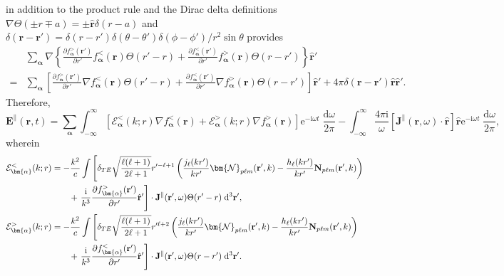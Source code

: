 in addition to the product rule and the Dirac delta definitions $\nabla\Theta(\pm r \mp a) = \pm\hat{\mathbf{r}}\delta(r - a)$ and $\delta(\mathbf{r} - \mathbf{r}') = \delta(r - r')\delta(\theta - \theta')\delta(\phi - \phi')/r^2\sin\theta$ provides
\begin{equation}
\begin{split}
&\sum_{\bm{\alpha}}\nabla\left\{\frac{\partial f_{\bm{\alpha}}^>(\mathbf{r}')}{\partial r'}f_{\bm{\alpha}}^<(\mathbf{r})\Theta(r' - r) + \frac{\partial f_{\bm{\alpha}}^<(\mathbf{r}')}{\partial r'}f_{\bm{\alpha}}^>(\mathbf{r})\Theta(r - r')\right\}\hat{\mathbf{r}}'\\
=&\sum_{\bm{\alpha}}\left[\frac{\partial f_{\bm{\alpha}}^>(\mathbf{r}')}{\partial r'}\nabla f_{\bm{\alpha}}^<(\mathbf{r})\Theta(r' - r) + \frac{\partial f_{\bm{\alpha}}^<(\mathbf{r}')}{\partial r'} \nabla f_{\bm{\alpha}}^>(\mathbf{r})\Theta(r - r')\right]\hat{\mathbf{r}}' + 4\pi\delta(\mathbf{r} - \mathbf{r}')\hat{\mathbf{r}}\hat{\mathbf{r}}'.
\end{split}
\end{equation}
Therefore,
\begin{equation}\label{eq:Elongitudinal2}
\mathbf{E}^\parallel(\mathbf{r},t) = \sum_{\bm{\alpha}}\int_{-\infty}^\infty\left[\mathcal{E}_{\bm{\alpha}}^<(k;r)\nabla f_{\bm{\alpha}}^<(\mathbf{r}) + \mathcal{E}_{\bm{\alpha}}^>(k;r)\nabla f_{\bm{\alpha}}^>(\mathbf{r})\right]\mathrm{e}^{-\mathrm{i}\omega t}\;\frac{\mathrm{d}\omega}{2\pi} - \int_{-\infty}^\infty\frac{4\pi\mathrm{i}}{\omega}\left[\mathbf{J}^\parallel(\mathbf{r},\omega)\cdot\hat{\mathbf{r}}\right]\hat{\mathbf{r}}\mathrm{e}^{-\mathrm{i}\omega t}\;\frac{\mathrm{d}\omega}{2\pi},
\end{equation}
wherein
\begin{equation}
\begin{split}
\mathcal{E}_{\bm{\alpha}}^<(k;r) &= -\frac{k^2}{c}\int\left[\delta_{TE}\sqrt{\frac{\ell(\ell + 1)}{2\ell + 1}}r'^{-\ell + 1}\left(\frac{j_\ell(kr')}{kr'}\bm{\mathcal{N}}_{p\ell m}(\mathbf{r}',k) - \frac{h_\ell(kr')}{kr'}\mathbf{N}_{p\ell m}(\mathbf{r}',k)\right)\right.\\
&\qquad+\left.\frac{\mathrm{i}}{k^3}\frac{\partial f_{\bm{\alpha}}^>(\mathbf{r}')}{\partial r'}\hat{\mathbf{r}}' 
\vphantom{\sqrt{\frac{\ell}{\ell}}} \right]\cdot\mathbf{J}^\parallel(\mathbf{r}',\omega)\Theta(r' - r)\;\mathrm{d}^3\mathbf{r}',\\
\mathcal{E}_{\bm{\alpha}}^>(k;r) &= -\frac{k^2}{c}\int\left[\delta_{TE}\sqrt{\frac{\ell(\ell + 1)}{2\ell + 1}}r'^{\ell + 2}\left(\frac{j_\ell(kr')}{kr'}\bm{\mathcal{N}}_{p\ell m}(\mathbf{r}',k) - \frac{h_\ell(kr')}{kr'}\mathbf{N}_{p\ell m}(\mathbf{r}',k)\right)\right.\\
&\qquad+\left.\frac{\mathrm{i}}{k^3}\frac{\partial f_{\bm{\alpha}}^<(\mathbf{r}')}{\partial r'}\hat{\mathbf{r}}' 
\vphantom{\sqrt{\frac{\ell}{\ell}}} \right]\cdot\mathbf{J}^\parallel(\mathbf{r}',\omega)\Theta(r - r')\;\mathrm{d}^3\mathbf{r}'.
\end{split}
\end{equation}

